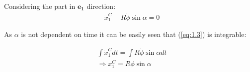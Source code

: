 Considering the part in $\boldsymbol{e_1}$ direction:
\begin{equation}\label{eq:1.3}
    \begin{split}
        &\dot x_1^C - R\dot\phi\sin\alpha = 0 
    \end{split}
\end{equation}

As $\alpha$ is not dependent on time it can be easily seen that (\ref{eq:1.3}) is integrable:

\begin{equation}\label{eq:1.4}
    \begin{split}
        &\int\dot x_1^Cdt = \int R\dot\phi\sin\alpha dt\\
        &\Rightarrow x_1^C = R\phi\sin\alpha
    \end{split}
\end{equation}

